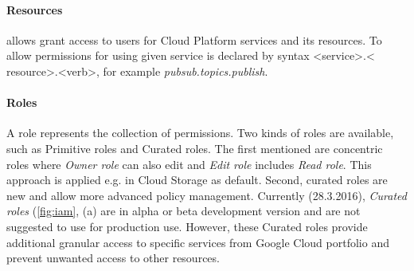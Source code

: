 \documentclass[a4paper,12pt,oneside]{report}
\begin{document}
	\paragraph{Resources} allows grant access to users for Cloud Platform services
	and its resources. To allow permissions for using given 
	service is declared by syntax \textless service\textgreater.\textless
	resource\textgreater.\textless verb\textgreater, for example
	\emph{pubsub.topics.publish}.
	
	\paragraph{Roles} A role represents the collection of permissions. Two kinds of
	roles 
	are available, such as Primitive roles and Curated roles. The first mentioned
	are concentric 
	roles where \textit{Owner role} can also edit and \textit{Edit role} includes 
	\textit{Read role}. This approach is applied e.g. in Cloud Storage as default.
	Second, 
	curated roles are new and allow more advanced policy management. 
	Currently (28.3.2016), \textit{Curated roles} (\ref{fig:iam}, (a) are in alpha or
	beta 
	development version and are not suggested to use for production 
	use. However, these Curated roles provide additional granular access to specific
	services 
	from Google Cloud portfolio and prevent unwanted access to 
	other resources. 
\end{document}
